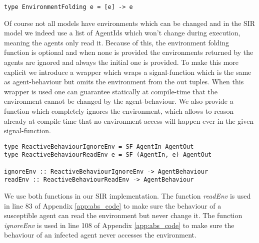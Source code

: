 \begin{verbatim}
type EnvironmentFolding e = [e] -> e
\end{verbatim}

Of course not all models have environments which can be changed and in the SIR model we indeed use a list of AgentIds which won't change during execution, meaning the agents only read it. Because of this, the environment folding function is optional and when none is provided the environments returned by the agents are ignored and always the initial one is provided.
To make this more explicit we introduce a wrapper which wraps a signal-function which is the same as agent-behaviour but omits the environment from the out tuples. When this wrapper is used one can guarantee statically at compile-time that the environment cannot be changed by the agent-behaviour. We also provide a function which completely ignores the environment, which allows to reason already at compile time that no environment access will happen ever in the given signal-function.

\begin{verbatim}
type ReactiveBehaviourIgnoreEnv = SF AgentIn AgentOut
type ReactiveBehaviourReadEnv e = SF (AgentIn, e) AgentOut

ignoreEnv :: ReactiveBehaviourIgnoreEnv -> AgentBehaviour
readEnv :: ReactiveBehaviourReadEnv -> AgentBehaviour
\end{verbatim}

We use both functions in our SIR implementation. The function \textit{readEnv} is used in line 83 of Appendix \ref{app:abs_code} to make sure the behaviour of a susceptible agent can read the environment but never change it. The function \textit{ignoreEnv} is used in line 108 of Appendix \ref{app:abs_code} to make sure the behaviour of an infected agent never accesses the environment.